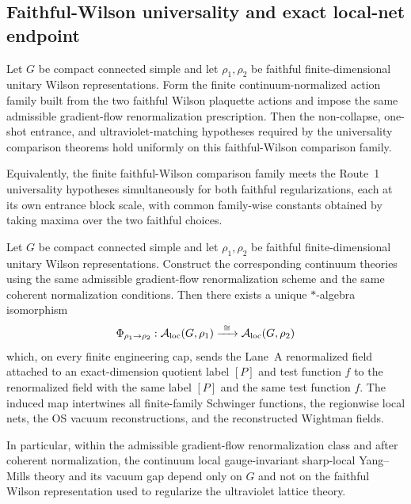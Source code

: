\subsection{Faithful-Wilson universality and exact local-net endpoint}

\begin{theorem}\label{thm:faithful-wilson-hypotheses}
Let $G$ be compact connected simple and let $\rho_1,\rho_2$ be faithful finite-dimensional unitary Wilson representations. Form the finite continuum-normalized action family built from the two faithful Wilson plaquette actions and impose the same admissible gradient-flow renormalization prescription. Then the non-collapse, one-shot entrance, and ultraviolet-matching hypotheses required by the universality comparison theorems hold uniformly on this faithful-Wilson comparison family.

Equivalently, the finite faithful-Wilson comparison family meets the Route~1 universality hypotheses simultaneously for both faithful regularizations, each at its own entrance block scale, with common family-wise constants obtained by taking maxima over the two faithful choices.
\end{theorem}


\begin{theorem}\label{thm:faithful-wilson-universality}
Let $G$ be compact connected simple and let $\rho_1,\rho_2$ be faithful finite-dimensional unitary Wilson representations. Construct the corresponding continuum theories using the same admissible gradient-flow renormalization scheme and the same coherent normalization conditions. Then there exists a unique $*$-algebra isomorphism
\[
\Phi_{\rho_1\to\rho_2}:\Aloc(G,\rho_1)\xrightarrow{\ \cong\ }\Aloc(G,\rho_2)
\]
which, on every finite engineering cap, sends the Lane~A renormalized field attached to an exact-dimension quotient label $[P]$ and test function $f$ to the renormalized field with the same label $[P]$ and the same test function $f$. The induced map intertwines all finite-family Schwinger functions, the regionwise local nets, the OS vacuum reconstructions, and the reconstructed Wightman fields.

In particular, within the admissible gradient-flow renormalization class and after coherent normalization, the continuum local gauge-invariant sharp-local Yang--Mills theory and its vacuum gap depend only on $G$ and not on the faithful Wilson representation used to regularize the ultraviolet lattice theory.
\end{theorem}

